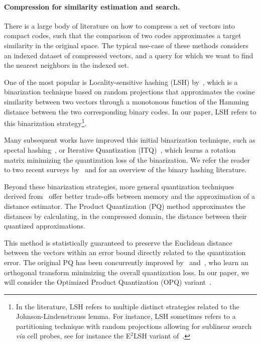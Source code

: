 \paragraph{Compression for similarity estimation and search.} There is a large body of literature on how to compress a set of vectors into compact codes, such that the comparison of two codes approximates a target similarity in the original space. The typical use-case of these methods considers an indexed dataset of compressed vectors, and a query for which we want to find the nearest neighbors in the indexed set.  

One of the most popular is Locality-sensitive hashing (LSH) by~\citet{C02}, which is a binarization technique based on random projections that approximates the cosine similarity between two vectors through a monotonous function of the Hamming distance between the two corresponding binary codes. In our paper, LSH refers to this binarization strategy\footnote{In the literature, LSH refers to multiple distinct strategies related to the Johnson-Lindenstrauss lemma. For instance, LSH sometimes refers to a partitioning technique with random projections allowing for sublinear search \emph{via} cell probes, see for instance the E$^2$LSH variant of~\citet{DIIM04}.}.

Many subsequent works have improved this initial binarization technique, such as spectal hashing~\citep{WTF09}, or Iterative Quantization (ITQ)~\citep{GL11}, which learns a rotation matrix minimizing the quantization loss of the binarization. We refer the reader to two recent surveys by~\citet{WSSJ14} and \citet{WLKC15} for an overview of the binary hashing literature. 

Beyond these binarization strategies,  more general quantization techniques derived from~\citet{JDS11} offer better trade-offs between memory and the approximation of a distance estimator. The Product Quantization (PQ) method approximates the distances by calculating, in the compressed domain, the distance between their quantized approximations. 

This method is statistically guaranteed to preserve the Euclidean distance between the vectors within an error bound directly related to the quantization error. The original PQ has been concurrently improved by~\citet{GHKS13} and~\citet{NF13}, who learn an orthogonal transform minimizing the overall quantization loss. In our paper, we will consider the Optimized Product Quantization (OPQ) variant~\citep{GHKS13}. 

